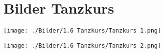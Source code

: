 \section{Bilder Tanzkurs}


\begin{center}
\begin{figurehere}
        \texttt{[image: ./Bilder/1.6 Tanzkurs/Tanzkurs 1.png]} 
\end{figurehere}
\end{center}	
	

\begin{center}
\begin{figurehere}
  \texttt{[image: ./Bilder/1.6 Tanzkurs/Tanzkurs 2.png]} 
\end{figurehere}
\end{center}


%
